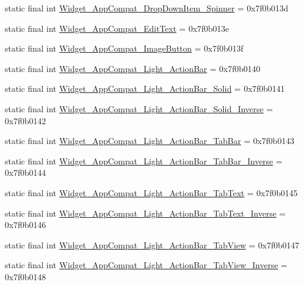 \begin{CompactItemize}
\item 
static final int \hyperlink{classandroid_1_1support_1_1mediacompat_1_1_r_1_1style_6afffab019a817cc798684a4c3a61568}{Widget\_\-AppCompat\_\-DropDownItem\_\-Spinner} = 0x7f0b013d
\item 
static final int \hyperlink{classandroid_1_1support_1_1mediacompat_1_1_r_1_1style_4215afcb8fa545645005e78b518ab131}{Widget\_\-AppCompat\_\-EditText} = 0x7f0b013e
\item 
static final int \hyperlink{classandroid_1_1support_1_1mediacompat_1_1_r_1_1style_5df6cd475cc6f1c1c2ef229c60e9f087}{Widget\_\-AppCompat\_\-ImageButton} = 0x7f0b013f
\item 
static final int \hyperlink{classandroid_1_1support_1_1mediacompat_1_1_r_1_1style_730bfddf9e5edd35f691f287fe5186bf}{Widget\_\-AppCompat\_\-Light\_\-ActionBar} = 0x7f0b0140
\item 
static final int \hyperlink{classandroid_1_1support_1_1mediacompat_1_1_r_1_1style_961815a1a83f791e46d6826b9e62910f}{Widget\_\-AppCompat\_\-Light\_\-ActionBar\_\-Solid} = 0x7f0b0141
\item 
static final int \hyperlink{classandroid_1_1support_1_1mediacompat_1_1_r_1_1style_622db1c62bf1c81484b9ffafa98586ee}{Widget\_\-AppCompat\_\-Light\_\-ActionBar\_\-Solid\_\-Inverse} = 0x7f0b0142
\item 
static final int \hyperlink{classandroid_1_1support_1_1mediacompat_1_1_r_1_1style_ff0d792ae58aef7a17aab125cfdef575}{Widget\_\-AppCompat\_\-Light\_\-ActionBar\_\-TabBar} = 0x7f0b0143
\item 
static final int \hyperlink{classandroid_1_1support_1_1mediacompat_1_1_r_1_1style_48c7527bdbd6ac2dcea27fc4d4634a73}{Widget\_\-AppCompat\_\-Light\_\-ActionBar\_\-TabBar\_\-Inverse} = 0x7f0b0144
\item 
static final int \hyperlink{classandroid_1_1support_1_1mediacompat_1_1_r_1_1style_f2e64bf81c2611c1146a002f4074db04}{Widget\_\-AppCompat\_\-Light\_\-ActionBar\_\-TabText} = 0x7f0b0145
\item 
static final int \hyperlink{classandroid_1_1support_1_1mediacompat_1_1_r_1_1style_532dde70a62d7efb41ff491801506f34}{Widget\_\-AppCompat\_\-Light\_\-ActionBar\_\-TabText\_\-Inverse} = 0x7f0b0146
\item 
static final int \hyperlink{classandroid_1_1support_1_1mediacompat_1_1_r_1_1style_2ffb47d8dc912737376a083519f13e11}{Widget\_\-AppCompat\_\-Light\_\-ActionBar\_\-TabView} = 0x7f0b0147
\item 
static final int \hyperlink{classandroid_1_1support_1_1mediacompat_1_1_r_1_1style_d9e27efb2834f2a2703f726164ff63a8}{Widget\_\-AppCompat\_\-Light\_\-ActionBar\_\-TabView\_\-Inverse} = 0x7f0b0148

\end{CompactItemize}
